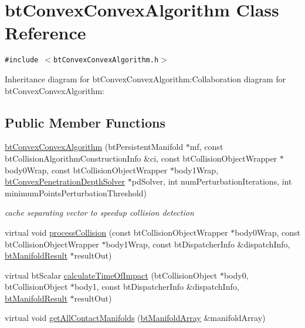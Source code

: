 \hypertarget{classbt_convex_convex_algorithm}{
\section{btConvexConvexAlgorithm Class Reference}
\label{classbt_convex_convex_algorithm}
}
{\tt \#include $<$btConvexConvexAlgorithm.h$>$}

Inheritance diagram for btConvexConvexAlgorithm:Collaboration diagram for btConvexConvexAlgorithm:\subsection*{Public Member Functions}
\begin{CompactItemize}
\item 
\hypertarget{classbt_convex_convex_algorithm_70134c01925ca835c4e29ab1bb0a049c}{
\hyperlink{classbt_convex_convex_algorithm_70134c01925ca835c4e29ab1bb0a049c}{btConvexConvexAlgorithm} (btPersistentManifold $\ast$mf, const btCollisionAlgorithmConstructionInfo \&ci, const btCollisionObjectWrapper $\ast$body0Wrap, const btCollisionObjectWrapper $\ast$body1Wrap, \hyperlink{classbt_convex_penetration_depth_solver}{btConvexPenetrationDepthSolver} $\ast$pdSolver, int numPerturbationIterations, int minimumPointsPerturbationThreshold)}
\label{classbt_convex_convex_algorithm_70134c01925ca835c4e29ab1bb0a049c}

\begin{CompactList}\small\item\em cache separating vector to speedup collision detection \item\end{CompactList}\item 
virtual void \hyperlink{classbt_convex_convex_algorithm_b566631355a17f7a4bcbddf9454eb9e5}{processCollision} (const btCollisionObjectWrapper $\ast$body0Wrap, const btCollisionObjectWrapper $\ast$body1Wrap, const btDispatcherInfo \&dispatchInfo, \hyperlink{classbt_manifold_result}{btManifoldResult} $\ast$resultOut)
\item 
virtual btScalar \hyperlink{classbt_convex_convex_algorithm_55f817b690c4e858d2b02607b382ce6b}{calculateTimeOfImpact} (btCollisionObject $\ast$body0, btCollisionObject $\ast$body1, const btDispatcherInfo \&dispatchInfo, \hyperlink{classbt_manifold_result}{btManifoldResult} $\ast$resultOut)
\item 
virtual void \hyperlink{classbt_convex_convex_algorithm_a2a195cdd3b45c169c15ea2de85c4038}{getAllContactManifolds} (\hyperlink{classbt_aligned_object_array}{btManifoldArray} \&manifoldArray)
\end{CompactItemize}



